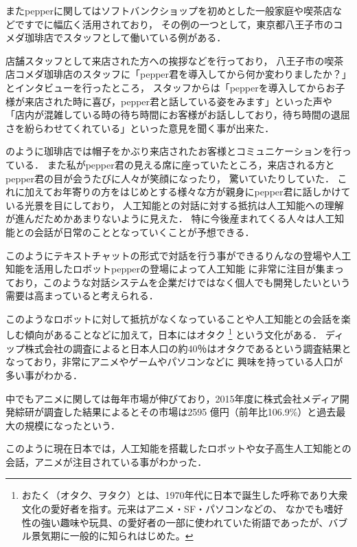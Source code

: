 またpepperに関してはソフトバンクショップを初めとした一般家庭や喫茶店などですでに幅広く活用されており，
その例の一つとして，東京都八王子市のコメダ珈琲店\cite{coffe}でスタッフとして働いている例がある．

店舗スタッフとして来店された方への挨拶などを行っており，
八王子市の喫茶店コメダ珈琲店のスタッフに「pepper君を導入してから何か変わりましたか？」とインタビューを行ったところ，
スタッフからは「pepperを導入してからお子様が来店された時に喜び，pepper君と話している姿をみます」といった声や
「店内が混雑している時の待ち時間にお客様がお話ししており，待ち時間の退屈さを紛らわせてくれている」といった意見を聞く事が出来た．


のように珈琲店では帽子をかぶり来店されたお客様とコミュニケーションを行っている．
また私がpepper君の見える席に座っていたところ，来店される方とpepper君の目が会うたびに人々が笑顔になったり，
驚いていたりしていた．
これに加えてお年寄りの方をはじめとする様々な方が親身にpepper君に話しかけている光景を目にしており，
人工知能との対話に対する抵抗は人工知能への理解が進んだためかあまりないように見えた．
特に今後産まれてくる人々は人工知能との会話が日常のこととなっていくことが予想できる．

このようにテキストチャットの形式で対話を行う事ができるりんなの登場や人工知能を活用したロボットpepperの登場によって人工知能
に非常に注目が集まっており，このような対話システムを企業だけではなく個人でも開発したいという需要は高まっていると考えられる．

このようなロボットに対して抵抗がなくなっていることや人工知能との会話を楽しむ傾向があることなどに加えて，日本にはオタク
\footnote{おたく（オタク、ヲタク）とは、1970年代に日本で誕生した呼称であり大衆文化の愛好者を指す。元来はアニメ・SF・パソコンなどの、
なかでも嗜好性の強い趣味や玩具、の愛好者の一部に使われていた術語であったが、バブル景気期に一般的に知られはじめた。\cite{ota}}
という文化がある．
ディップ株式会社の調査によると日本人口の約40％はオタクであるという調査結果となっており，非常にアニメやゲームやパソコンなどに
興味を持っている人口が多い事がわかる．

中でもアニメに関しては毎年市場が伸びており，2015年度に株式会社メディア開発綜研が調査した結果によるとその市場は2595
億円（前年比106.9\%）と過去最大の規模になったという．\cite{anime}

このように現在日本では，人工知能を搭載したロボットや女子高生人工知能との会話，アニメが注目されている事がわかった．


